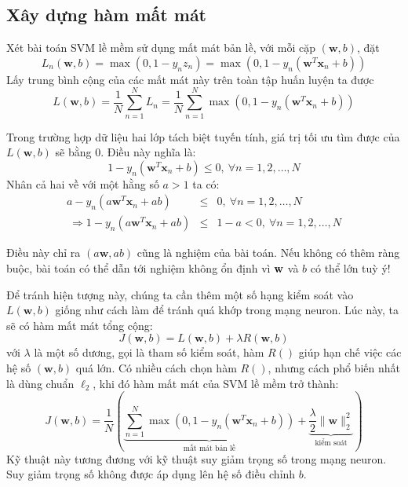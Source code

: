 \subsection{Xây dựng hàm mất mát}
Xét bài toán SVM lề mềm sử dụng
mất mát bản lề, với mỗi cặp $(\mathbf{w}, b)$, đặt
\begin{equation}
L_n(\mathbf{w}, b) = \max(0, 1 - y_nz_n) = \max(0, 1 -
y_n(\mathbf{w}^T\mathbf{x}_n + b))
\end{equation}
Lấy trung bình cộng của các mất mát này trên toàn tập huấn luyện ta được
\begin{equation*}
L(\mathbf{w}, b) = \frac{1}{N}\sum_{n=1}^N L_n = \frac{1}{N}\sum_{n=1}^N \max(0,
1 - y_n(\mathbf{w}^T\mathbf{x}_n + b))
\end{equation*}

Trong trường hợp dữ liệu hai lớp tách biệt tuyến tính,
giá trị tối ưu tìm được của $L(\mathbf{w}, b)$ sẽ bằng 0. Điều này nghĩa là:
\begin{equation}
1 - y_n (\mathbf{w}^T\mathbf{x}_n + b) \leq 0, ~\forall n = 1, 2, \dots, N
\end{equation}
Nhân cả hai về với một hằng số $a > 1$ ta có:
\begin{eqnarray}
a - y_n (a\mathbf{w}^T\mathbf{x}_n + ab) &\leq& 0, ~\forall n = 1, 2, \dots, N \\\
\Rightarrow 1 - y_n (a\mathbf{w}^T\mathbf{x}_n + ab) &\leq& 1 - a < 0, ~\forall n = 1, 2, \dots, N
\end{eqnarray}

Điều này chỉ ra $(a\mathbf{w}, ab)$ cũng là nghiệm của bài toán. Nếu không có thêm ràng buộc, bài toán có thể dẫn tới nghiệm không ổn định vì $\mathbf{w}$ và $b$ có thể lớn tuỳ ý!

Để tránh hiện tượng này, chúng ta cần thêm một số hạng kiểm soát vào $L(\mathbf{w},
b)$ giống như cách làm để
tránh quá khớp trong mạng neuron. Lúc này, ta sẽ có hàm mất mát
tổng cộng:
\begin{equation*}
J(\mathbf{w}, b) = L(\mathbf{w}, b) + \lambda R(\mathbf{w}, b)
\end{equation*}
với $\lambda$ là một số dương, gọi là tham số kiểm soát, hàm
$R()$ giúp hạn chế việc các hệ số $(\mathbf{w}, b)$ quá lớn. Có nhiều
cách chọn hàm $R()$, nhưng cách phổ biến nhất là dùng chuẩn $\ell_2$, khi đó hàm mất mát của
SVM lề mềm trở thành:
\begin{equation}
\label{eqn:20_21}
J(\mathbf{w}, b) = \frac{1}{N}\left(\underbrace{\sum_{n=1}^N \max(0, 1 -
y_n(\mathbf{w}^T\mathbf{x}_n + b))}_{\text{mất mát bản lề}} +
\underbrace{\frac{\lambda}{2}
\|\mathbf{w}\|_2^2}_{\text{kiểm soát}}\right)
\end{equation}
Kỹ thuật này tương đương với kỹ thuật suy giảm trọng số trong mạng neuron. Suy giảm trọng số không được áp dụng lên hệ số điều chỉnh $b$.


